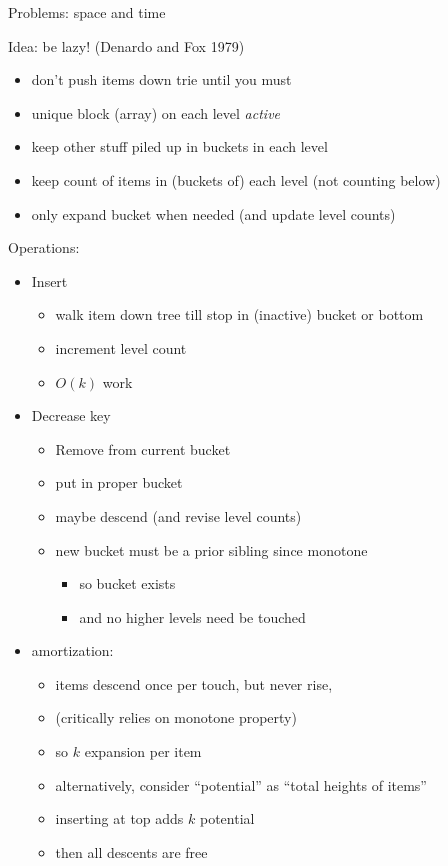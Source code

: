 \documentclass{article}
\begin{document}
Problems: space and time

Idea: be lazy!  (Denardo and Fox 1979)
\begin{itemize}
\item don't push items down trie until you must
\item unique block (array) on each level \emph{active}
\item keep other stuff piled up in buckets in each level
\item keep count of items in (buckets of) each level (not counting below)
\item only expand bucket when needed (and update level counts)
\end{itemize}

Operations:
\begin{itemize}
\item Insert
  \begin{itemize}
  \item walk item down tree till stop in (inactive) bucket or bottom
  \item increment level count
  \item $O(k)$ work
  \end{itemize}
\item Decrease key
  \begin{itemize}
  \item Remove from current bucket
  \item put in proper bucket
  \item maybe descend (and revise level counts)
  \item new bucket must be a prior sibling since monotone
    \begin{itemize}
    \item so bucket exists
    \item and no higher levels need be touched
    \end{itemize}
  \end{itemize}
\item amortization:
  \begin{itemize}
  \item items descend once per touch, but never rise, 
  \item (critically relies on monotone property)
  \item so $k$ expansion per item
  \item alternatively, consider ``potential'' as ``total heights of
    items''
  \item inserting at top adds $k$ potential
  \item then all descents are free

\end{itemize}
\end{itemize}
\end{document}
